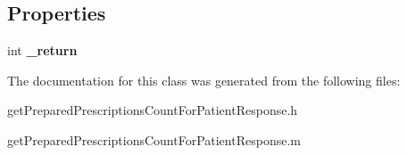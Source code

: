 \subsection*{Properties}
\begin{DoxyCompactItemize}
\item 
\hypertarget{interfaceget_prepared_prescriptions_count_for_patient_response_a654940840910ed1fb405ba67ee6118e7}{}int {\bfseries \+\_\+return}\label{interfaceget_prepared_prescriptions_count_for_patient_response_a654940840910ed1fb405ba67ee6118e7}

\end{DoxyCompactItemize}


The documentation for this class was generated from the following files\+:\begin{DoxyCompactItemize}
\item 
get\+Prepared\+Prescriptions\+Count\+For\+Patient\+Response.\+h\item 
get\+Prepared\+Prescriptions\+Count\+For\+Patient\+Response.\+m\end{DoxyCompactItemize}
